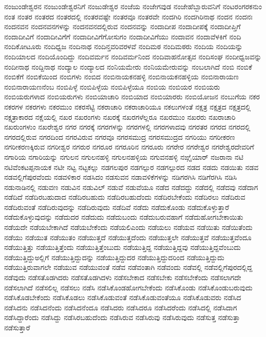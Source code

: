 {ನಂಜುಂಡೇಶ್ವರನ
ನಂಜುಂಡೇಶ್ವರನಿಗೆ
ನಂಜುಡೇಶ್ವರ
ನಂಜೆಯ
ನಂಜೇಗವುಡ
ನಂಜೇಹೆಬ್ಬಾರುವನಿಗೆ
ನಂಟರಂಗರಕನುಂ
ನಂತ
ನಂತರ
ನಂತರದ
ನಂತರದಲ್ಲಿ
ನಂತರವಷ್ಟೇ
ನಂತರವೂ
ನಂತರವೇ
ನಂದಗಿರಿ
ನಂದಗಿರಿನಾಥ
ನಂದನ
ನಂದನಃ
ನಂದನವನ
ನಂದನವನಗಳನ್ನು
ನಂದನವನದಲ್ಲಿರುವ
ನಂದನವನ್ನು
ನಂದಾದೀಪ
ನಂದಾದೀಪಕ್ಕೆ
ನಂದಾದೀಪ್ತಿಗೆ
ನಂದಾದೀವಿಗೆ
ನಂದಾದೀವಿಗೆಗೆ
ನಂದಾದೀವಿಗೆಗೋಸುಗಂ
ನಂದಾದೀವಿಗೆಯು
ನಂದಾವನ
ನಂದಾವೆಳಕಿಗೆ
ನಂದಿ
ನಂದಿಕೋಟೂರು
ನಂದಿಧ್ವಜ
ನಂದಿನಾಥ
ನಂದಿನ್ತವರಿವರಳವೆ
ನಂದಿಮಠ
ನಂದಿಮಠರು
ನಂದಿಯ
ನಂದಿಯನ್ನು
ನಂದಿಯಾಲದ
ನಂದಿಯೊಂದಿದ್ದು
ನಂದಿವರ್ಮನ
ನಂದಿವರ್ಮನಿಂದ
ನಂದಿವಾಹನೋತ್ಸವ
ನಂದಿಸಂಘ
ನಂದೀಧ್ವಜವನ್ನು
ನಂದೀನಾಥ
ನಂದ್ದಿನಾಥ
ನಂದ್ಯಾಲ
ನಂದ್ಯಾಲದ
ನಂನಿಯಮೇರು
ನಂನಿಯಮೇರುವನ್ನು
ನಂಬಲಾಗಿದೆ
ನಂಬಿ
ನಂಬಿಕೆ
ನಂಬಿಕೆಗೆ
ನಂಬಿಕೆಯಿಂದ
ನಂಬಿಗಳು
ನಂಬಿದ
ನಂಬಿನಾಯಕನಹಳ್ಳಿ
ನಂಬಿನಾಯಕನಹಳ್ಳಿಯ
ನಂಬಿನಾರಾಯಣ
ನಂಬಿನಾರಾಯಣನೆಂಬ
ನಂಬಿಪಿಳ್ಳೆ
ನಂಬಿಪಿಳ್ಳೆಯ
ನಂಬಿಪಿಳ್ಳೆಯೂ
ನಂಬಿಯ
ನಂಬಿಯರ
ನಂಬಿಯರು
ನಂಬಿಯರುಗಳಾದ
ನಂಬಿಯರುಗಳು
ನಂಬಿಯಾಚಾರಿ
ನಂಬಿಯಾದ
ನಂಬಿಯಾರರು
ನಂಬಿಯೋಜನ
ನಂಬುಗೆಯ
ನಕರ
ನಕರಗಳ
ನಕರಗಳು
ನಕರಮುಂ
ನಕರಸೆಟ್ಟಿ
ನಕರಾಚಾರಿ
ನಕರಾಚಾರಿಯೂ
ನಕಲುಗಳಂತೆ
ನಕ್ಷತ್ರ
ನಕ್ಷತ್ರದ
ನಕ್ಷತ್ರದಲ್ಲಿ
ನಕ್ಷತ್ರಾಕಾರದ
ನಕ್ಷೆಯಲ್ಲಿ
ನಖರ
ನಖರಂಗಳು
ನಖರಕ್ಕೆ
ನಖರಗಳೆಲ್ಲರೂ
ನಖರಮುಂ
ನಖರರು
ನಖರಾಚಾರಿ
ನಖರುಂಗಳುಂ
ನಖರೇಶ್ವರ
ನಗರ
ನಗರಕ್ಕೆ
ನಗರಗಳನ್ನು
ನಗರಗಳಲ್ಲಿ
ನಗರಗಳಾದವು
ನಗರತರ
ನಗರದ
ನಗರದಲ್ಲಿ
ನಗರದಲ್ಲಿರುವ
ನಗರದಿಂದ
ನಗರವಿರುವ
ನಗರವೂ
ನಗರಸಮುದ್ರ
ನಗರಸಮುದ್ರದ
ನಗರಿಯು
ನಗರೀಕರಣ
ನಗರೀಕರಣಕ್ಕಿರುವ
ನಗರೀಶ್ವರ
ನಗರುರ
ನಗರೂರ
ನಗರೂರಿನ
ನಗರೂರು
ನಗರೇರ
ನಗರೇಶ್ವರ
ನಗರೇಶ್ವರದೇವರಿಗೆ
ನಗಾರಿಯ
ನಗಾರಿಯನ್ನು
ನಗುಲನ
ನಗುಲನಹಳ್ಳಿ
ನಗುಲನಹಳ್ಳಿಯ
ನಗುವನಹಳ್ಳಿ
ನಙ್ಗೈಯಾರ್
ನಜರಾನಾ
ನಟಿ
ನಟಿವೆಂಕಟಪ್ಪನಾಯಕ
ನಟೀ
ನಟ್ಟ
ನಟ್ಟಕಲ್ಲು
ನಡಗಲಪುರ
ನಡಗಲ್ಪುರ
ನಡಗಲ್ಪುರದ
ನಡದ
ನಡದು
ನಡಯಿತು
ನಡವ
ನಡವಲ್ಲಿಗೆಪುರವೆಂದು
ನಡವಳಿಕಾರ
ನಡಸಿದಂ
ನಡಸುವನ
ನಡಾವಳಿಕೆಗಳನ್ನು
ನಡಿಗರಗಿಸಿ
ನಡಿಗೆರಗಿಸಿ
ನಡಿಸಿ
ನಡುನಾಡಿನಲ್ಲಿ
ನಡುವಣ
ನಡುವಿನ
ನಡುವಿಲ್
ನಡುವೆ
ನಡುವೆಯೂ
ನಡೆದ
ನಡೆದದ್ದು
ನಡೆದಲ್ಲಿ
ನಡೆದವು
ನಡೆದಾಗ
ನಡೆದಿದೆ
ನಡೆದಿರಬಹುದಾದ
ನಡೆದಿರಬಹುದು
ನಡೆದಿರಬಹುದೆಂದು
ನಡೆದಿರಬೇಕೆಂದು
ನಡೆದಿರಲು
ನಡೆದಿರುವ
ನಡೆದಿರುವಂತೆ
ನಡೆದಿರುವುದನ್ನು
ನಡೆದಿರುವುದು
ನಡೆದಿವೆ
ನಡೆದು
ನಡೆದುಕೊಂಡು
ನಡೆದುಕೊಳ್ಳುತ್ತಾರೆ
ನಡೆದುಕೊಳ್ಳುವುದನ್ನು
ನಡೆದುದರ
ನಡೆದುದು
ನಡೆದುಬಂದು
ನಡೆದುಬರುವಹಾಗೆ
ನಡೆದುಹೋಗಬೇಕಾಯಿತು
ನಡೆಯದೇ
ನಡೆಯಬೇಕಾಗಿದೆ
ನಡೆಯಬೇಕೆಂದು
ನಡೆಯಲಿಎಂದು
ನಡೆಯಲು
ನಡೆಯವ
ನಡೆಯಿತು
ನಡೆಯಿತೆಂದು
ನಡೆಯು
ನಡೆಯುತ
ನಡೆಯುತಂ
ನಡೆಯುತ್ತದೆ
ನಡೆಯುತ್ತದೆಂದು
ನಡೆಯುತ್ತಲೇ
ನಡೆಯುತ್ತವೆ
ನಡೆಯುತ್ತವೆಂದೂ
ನಡೆಯುತ್ತಿತ್ತು
ನಡೆಯುತ್ತಿತ್ತೆಂದು
ನಡೆಯುತ್ತಿತ್ತೆಂಬುದು
ನಡೆಯುತ್ತಿದ್ದ
ನಡೆಯುತ್ತಿದ್ದವು
ನಡೆಯುತ್ತಿದ್ದವೆಂಬುದು
ನಡೆಯುತ್ತಿದ್ದುಅಲ್ಲಿಗೆ
ನಡೆಯುತ್ತಿದ್ದುದನ್ನು
ನಡೆಯುತ್ತಿದ್ದುದರ
ನಡೆಯುತ್ತಿದ್ದುದರಿಂದ
ನಡೆಯುತ್ತಿದ್ದುದು
ನಡೆಯುತ್ತಿರುವಾಗಲೇ
ನಡೆಯುವ
ನಡೆಯುವಂತೆ
ನಡೆವ
ನಡೆವಂತಾಗಿ
ನಡೆವಂದು
ನಡೆವಲ್ಲಿ
ನಡೆವಲ್ಲಿಗೆಪುರದಲ್ಲಿದ್ದ
ನಡೆವುದು
ನಡೆಸತೊಡಗಿದರು
ನಡೆಸತೊಡಗಿದಳು
ನಡೆಸಬೇಕಾದ
ನಡೆಸಬೇಕು
ನಡೆಸಬೇಕೆಂದು
ನಡೆಸಲಾಗದೇ
ನಡೆಸಲಾಗಿದೆ
ನಡೆಸಲಿಲ್ಲ
ನಡೆಸಲು
ನಡೆಸಿ
ನಡೆಸಿಕೊಂಡಹೋಗಬೇಕೆಂದು
ನಡೆಸಿಕೊಂಡು
ನಡೆಸಿಕೊಂಡುಬರುವುದು
ನಡೆಸಿಕೊಡಬೇಕೆಂದು
ನಡೆಸಿಕೊಡಲು
ನಡೆಸಿಕೊಡುವಂತೆ
ನಡೆಸಿಕೊಡುವಂತೆಯೂ
ನಡೆಸಿಕೊಡುವರು
ನಡೆಸಿದ
ನಡೆಸಿದನು
ನಡೆಸಿದನೆಂದು
ನಡೆಸಿದನೆಂದೂ
ನಡೆಸಿದರು
ನಡೆಸಿದರೂ
ನಡೆಸಿದರೆಂದು
ನಡೆಸಿದಲ್ಲಿ
ನಡೆಸಿದಾಗ
ನಡೆಸಿದ್ದಾರೆಂದು
ನಡೆಸಿದ್ದು
ನಡೆಸಿರಬಹುದೆಂದು
ನಡೆಸಿರುವ
ನಡೆಸಿರುವು
ನಡೆಸಿರುವುದು
ನಡೆಸುತ್ತ
ನಡೆಸುತ್ತಾ
ನಡೆಸುತ್ತಾರೆ
}
